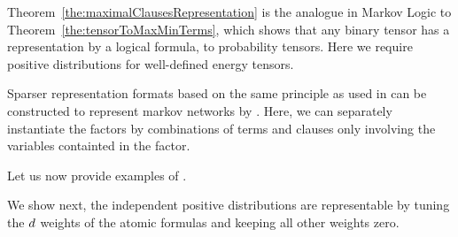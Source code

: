 
Theorem~\ref{the:maximalClausesRepresentation} is the analogue in Markov Logic to Theorem~\ref{the:tensorToMaxMinTerms}, which shows that any binary tensor has a representation by a logical formula, to probability tensors.
Here we require positive distributions for well-defined energy tensors.

Sparser representation formats based on the same principle as used in  can be constructed to represent markov networks by \MarkovLogicNetworks{}.
Here, we can separately instantiate the factors by combinations of terms and clauses only involving the variables containted in the factor.


Let us now provide examples of \MarkovLogicNetworks{}.


We show next, the independent positive distributions are representable by tuning the $d$ weights of the atomic formulas and keeping all other weights zero.

